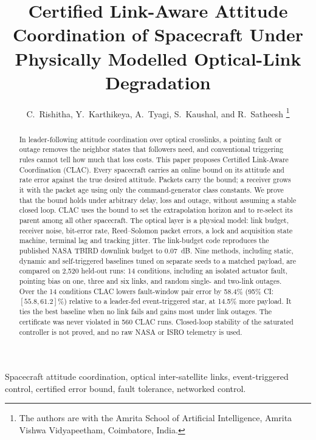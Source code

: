 \documentclass[journal]{IEEEtran}
\begin{document}
\title{Certified Link-Aware Attitude Coordination of Spacecraft Under Physically Modelled Optical-Link Degradation}

\author{C.~Rishitha, Y.~Karthikeya, A.~Tyagi, S.~Kaushal, and R.~Satheesh%
\thanks{The authors are with the Amrita School of Artificial Intelligence, Amrita Vishwa Vidyapeetham, Coimbatore, India.}}

\maketitle

\begin{abstract}
In leader-following attitude coordination over optical crosslinks, a pointing fault or outage removes the neighbor states that followers need, and conventional triggering rules cannot tell how much that loss costs. This paper proposes Certified Link-Aware Coordination (CLAC). Every spacecraft carries an online bound on its attitude and rate error against the true desired attitude. Packets carry the bound; a receiver grows it with the packet age using only the command-generator class constants. We prove that the bound holds under arbitrary delay, loss and outage, without assuming a stable closed loop. CLAC uses the bound to set the extrapolation horizon and to re-select its parent among all other spacecraft. The optical layer is a physical model: link budget, receiver noise, bit-error rate, Reed--Solomon packet errors, a lock and acquisition state machine, terminal lag and tracking jitter. The link-budget code reproduces the published NASA TBIRD downlink budget to 0.07~dB. Nine methods, including static, dynamic and self-triggered baselines tuned on separate seeds to a matched payload, are compared on 2{,}520 held-out runs: 14 conditions, including an isolated actuator fault, pointing bias on one, three and six links, and random single- and two-link outages. Over the 14 conditions CLAC lowers fault-window pair error by 58.4\% (95\% CI: $[55.8, 61.2]\%$) relative to a leader-fed event-triggered star, at 14.5\% more payload. It ties the best baseline when no link fails and gains most under link outages. The certificate was never violated in 560 CLAC runs. Closed-loop stability of the saturated controller is not proved, and no raw NASA or ISRO telemetry is used.
\end{abstract}

\begin{IEEEkeywords}
Spacecraft attitude coordination, optical inter-satellite links, event-triggered control, certified error bound, fault tolerance, networked control.
\end{IEEEkeywords}
\end{document}
